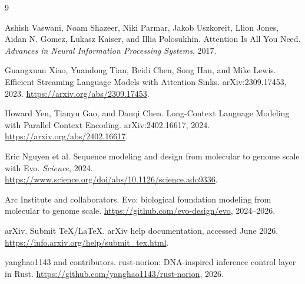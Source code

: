 \documentclass[10pt]{article}
\begin{document}
\begin{thebibliography}{9}

Ashish Vaswani, Noam Shazeer, Niki Parmar, Jakob Uszkoreit, Llion Jones,
Aidan N. Gomez, Lukasz Kaiser, and Illia Polosukhin. Attention Is All You Need.
\textit{Advances in Neural Information Processing Systems}, 2017.

Guangxuan Xiao, Yuandong Tian, Beidi Chen, Song Han, and Mike Lewis. Efficient
Streaming Language Models with Attention Sinks. arXiv:2309.17453, 2023.
\url{https://arxiv.org/abs/2309.17453}.

Howard Yen, Tianyu Gao, and Danqi Chen. Long-Context Language Modeling with
Parallel Context Encoding. arXiv:2402.16617, 2024.
\url{https://arxiv.org/abs/2402.16617}.

Eric Nguyen et al. Sequence modeling and design from molecular to genome scale
with Evo. \textit{Science}, 2024.
\url{https://www.science.org/doi/abs/10.1126/science.ado9336}.

Arc Institute and collaborators. Evo: biological foundation modeling from
molecular to genome scale. \url{https://github.com/evo-design/evo}, 2024--2026.

arXiv. Submit TeX/LaTeX. arXiv help documentation, accessed June 2026.
\url{https://info.arxiv.org/help/submit_tex.html}.

yanghao1143 and contributors. rust-norion: DNA-inspired inference control layer
in Rust. \url{https://github.com/yanghao1143/rust-norion}, 2026.

\end{thebibliography}
\end{document}
